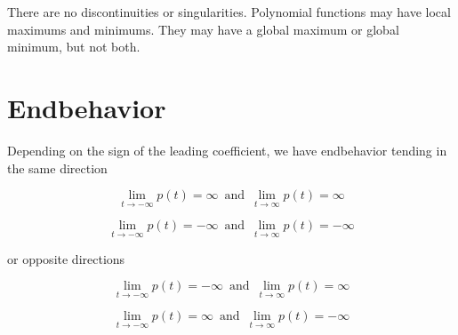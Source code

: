 \documentclass{ximera}
\begin{document}
There are no discontinuities or singularities.  Polynomial functions may have local maximums and minimums. They may have a global maximum or global minimum, but not both.


\section{Endbehavior}



Depending on the sign of the leading coefficient, we have endbehavior tending in the same direction




\[    \lim_{t \to -\infty} p(t) =  \infty  \,   \text{ and }  \,     \lim_{t \to \infty} p(t) = \infty      \]

\[    \lim_{t \to -\infty} p(t) =  -\infty  \,   \text{ and }  \,     \lim_{t \to \infty} p(t) = -\infty      \]

or opposite directions

\[    \lim_{t \to -\infty} p(t) =  -\infty  \,   \text{ and }  \,     \lim_{t \to \infty} p(t) = \infty      \]

\[    \lim_{t \to -\infty} p(t) =  \infty  \,   \text{ and }  \,     \lim_{t \to \infty} p(t) = -\infty      \]
\end{document}
